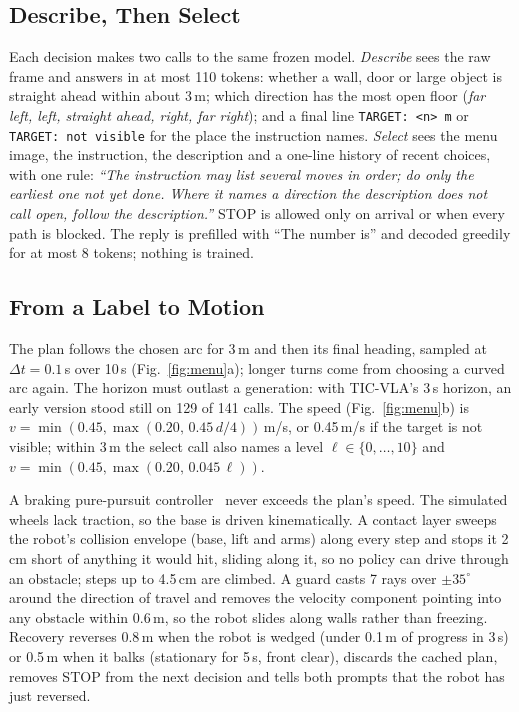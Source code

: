 \documentclass[runningheads]{llncs}
\begin{document}
\subsection{Describe, Then Select}
\label{sec:chain}

Each decision makes two calls to the same frozen model. \emph{Describe} sees the raw frame
and answers in at most 110 tokens: whether a wall, door or large object is straight ahead
within about 3\,m; which direction has the most open floor (\emph{far left, left, straight
ahead, right, far right}); and a final line \texttt{TARGET:~<n>~m} or
\texttt{TARGET:~not~visible} for the place the instruction names. \emph{Select} sees the menu image, the instruction, the description and a one-line history of
recent choices, with one rule: \emph{``The instruction may list several moves in order; do
only the earliest one not yet done. Where it names a direction the description does not call
open, follow the description.''} STOP is allowed only on arrival or when every path is
blocked. The reply is prefilled with ``The number is'' and decoded greedily for at most 8
tokens; nothing is trained.

\subsection{From a Label to Motion}
\label{sec:plan}

The plan follows the chosen arc for 3\,m and then its final heading, sampled at
$\Delta t=0.1$\,s over 10\,s (Fig.~\ref{fig:menu}a); longer turns come from choosing a curved
arc again. The horizon must outlast a generation: with TIC-VLA's 3\,s horizon, an early
version stood still on 129 of 141 calls. The speed (Fig.~\ref{fig:menu}b) is
$v=\min(0.45,\max(0.20,\,0.45\,d/4))$\,m/s, or 0.45\,m/s if the target is not visible;
within 3\,m the select call also names a level $\ell\in\{0,\dots,10\}$ and
$v=\min(0.45,\max(0.20,\,0.045\,\ell))$.

A braking pure-pursuit controller~\cite{coulter1992pure} never exceeds the plan's speed. The
simulated wheels lack traction, so the base is driven kinematically. A contact layer sweeps
the robot's collision envelope (base, lift and arms) along every step and stops it 2\,cm short
of anything it would hit, sliding along it, so no policy can drive through an obstacle; steps
up to 4.5\,cm are climbed. A guard casts 7 rays over $\pm35^\circ$ around the
direction of travel and removes the velocity component pointing into any obstacle within
0.6\,m, so the robot slides along walls rather than freezing. Recovery reverses 0.8\,m when
the robot is wedged (under 0.1\,m of progress in 3\,s) or 0.5\,m when it balks (stationary
for 5\,s, front clear), discards the cached plan, removes STOP from the next decision and
tells both prompts that the robot has just reversed.
\end{document}
